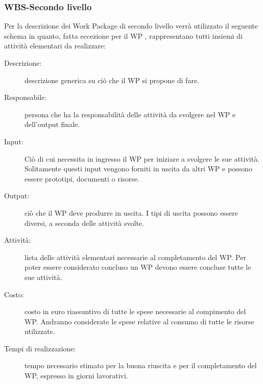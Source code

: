 \subsubsection {WBS-Secondo livello}
Per la descrizione dei Work Package di secondo livello verrà utilizzato il seguente schema in quanto, fatta eccezione per il WP %
, rappresentano tutti insiemi di attività elementari da realizzare:
\begin{description}
\item[Descrizione:] descrizione generica su ciò che il WP si propone di fare.
\item[Responsabile:] persona che ha la responsabilità delle attività da svolgere nel WP e dell'output finale.
\item[Input:] Ciò di cui necessita in ingresso il WP per iniziare a svolgere le sue attività. Solitamente questi input vengono forniti in uscita da altri WP e possono essere prototipi, documenti o risorse.
\item[Output:] ciò che il WP deve produrre in uscita. I tipi di uscita possono essere diversi, a seconda delle attività svolte.
\item[Attività:] lista delle attività elementari necessarie al completamento del WP. Per poter essere considerato concluso un WP devono essere concluse tutte le sue attività.
\item[Costo:] costo in euro riassuntivo di tutte le spese necessarie al compimento del WP. Andranno considerate le spese relative al consumo di tutte le risorse utilizzate.
\item[Tempi di realizzazione:] tempo necessario stimato per la buona riuscita e per il completamento del WP, espresso in giorni lavorativi.
\end{description}

